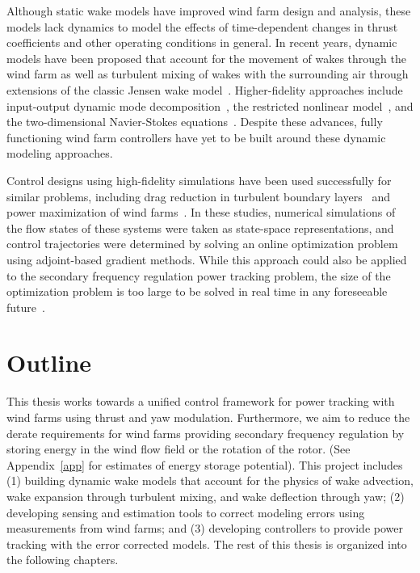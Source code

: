 Although static wake models have improved wind farm design and analysis, these models lack dynamics to model the effects of time-dependent changes in thrust coefficients and other operating conditions in general. In recent years, dynamic models have been proposed that account for the movement of wakes through the wind farm as well as turbulent mixing of wakes with the surrounding air through extensions of the classic Jensen wake model~\cite{Larsen2008a, Annoni2016b, Gebraad2014b, Gebraad2015b}. Higher-fidelity approaches include input-output dynamic mode decomposition~\cite{Annoni2016a}, the restricted nonlinear model~\cite{Bretheim2018a}, and the two-dimensional Navier-Stokes equations~\cite{Doekemeijer2017a, Boersma2018a}. Despite these advances, fully functioning wind farm controllers have yet to be built around these dynamic modeling approaches.

Control designs using high-fidelity simulations have been used successfully for similar problems, including drag reduction in turbulent boundary layers~\cite{Bewley2001a} and power maximization of wind farms~\cite{Goit2015a}. In these studies, numerical simulations of the flow states of these systems were taken as state-space representations, and control trajectories were determined by solving an online optimization problem using adjoint-based gradient methods. While this approach could also be applied to the secondary frequency regulation power tracking problem, the size of the optimization problem is too large to be solved in real time in any foreseeable future~\cite{Goit2015a}. 

\section{Outline}
\label{sec:intro-outline}
This thesis works towards a unified control framework for power tracking with wind farms using thrust and yaw modulation. Furthermore, we aim to reduce the derate requirements for wind farms providing secondary frequency regulation by storing energy in the wind flow field or the rotation of the rotor.  (See Appendix~\ref{app} for estimates of energy storage potential). This project includes (1) building dynamic wake models that account for the physics of wake advection, wake expansion through turbulent mixing, and wake deflection through yaw; (2) developing sensing and estimation tools to correct modeling errors using measurements from wind farms; and (3) developing controllers to provide power tracking with the error corrected models. The rest of this thesis is organized into the following chapters.

